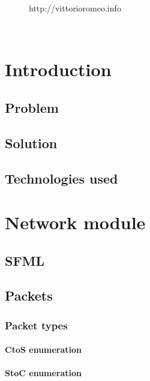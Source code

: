 \documentclass{report}
\begin{document}
\begin{titlepage}
\begin{minipage}{\linewidth}
\begin{minipage}{0.35\linewidth}
\begin{figure}[H]
		            http://vittorioromeo.info
		        \end{figure}
		    \end{minipage}
		\end{minipage}\\[3cm]
	\end{titlepage}


	\tableofcontents
	\newpage
	
	\chapter{Introduction}
		\section{Problem}
		
		\section{Solution}
		
		\section{Technologies used}
	
	\newpage

	\chapter{Network module}
		\section{SFML}

		\section{Packets}
			\subsection{Packet types}
				\subsubsection{CtoS enumeration}
				\subsubsection{StoC enumeration}
			
\end{document}
